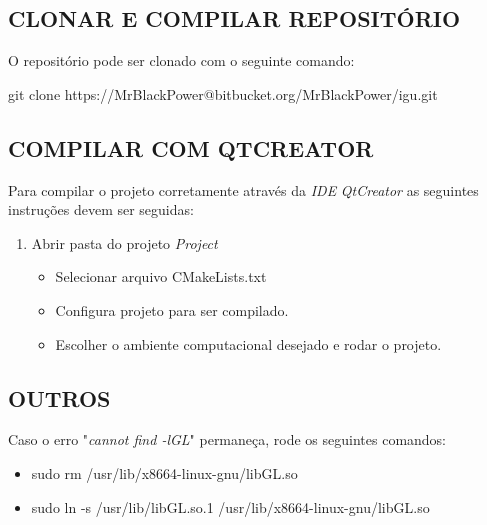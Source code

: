 \begin{appendices}
	\section{CLONAR E COMPILAR REPOSITÓRIO}\label{compile}
	
	O repositório pode ser clonado com o seguinte comando:
	
	git clone https://MrBlackPower@bitbucket.org/MrBlackPower/igu.git
	
	
	
	\subsection{COMPILAR COM QTCREATOR}\label{qtcreator}
	
	Para compilar o projeto corretamente através da \textit{IDE} \textit{QtCreator} as seguintes instruções devem ser seguidas:
	
	\begin{enumerate}
		\item Abrir pasta do projeto \textit{Project}
		\begin{itemize}
			\item Selecionar arquivo CMakeLists.txt
			\item Configura projeto para ser compilado.
			\item Escolher o ambiente computacional desejado e rodar o projeto.
		\end{itemize}
	\end{enumerate}
	
	\subsection{OUTROS}\label{cmake}
	
	Caso o erro "\textit{cannot find -lGL}" permaneça, rode os seguintes comandos:
	
	\begin{itemize}
		\item sudo rm /usr/lib/x86\underline{\space\space}64-linux-gnu/libGL.so
		\item sudo ln -s /usr/lib/libGL.so.1 /usr/lib/x86\underline{\space\space}64-linux-gnu/libGL.so
	\end{itemize}
	

\end{appendices}
